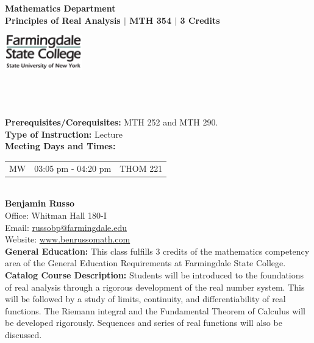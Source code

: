 \documentclass[11pt]{article}
\begin{document}
\begin{minipage}[]{.7\textwidth}
{\bf Mathematics Department}\\
{\bf  Principles of Real Analysis $\mid$  MTH 354 $\mid$ 3 Credits}
\end{minipage}\begin{minipage}[]{.3\textwidth}\begin{flushright}\includegraphics[height=1.5cm]{farmingdalelogo.jpg}\end{flushright}\end{minipage}\\
\ \\ 
\ \\
{\bf Prerequisites/Corequisites:} MTH 252 and MTH 290.\\

{\bf Type of Instruction: }Lecture\\

{\bf Meeting Days and Times: }\begin{tabular}[t]{rrr}
MW & 03:05 pm - 04:20 pm &THOM 221\\
\end{tabular}\\

{\bf Benjamin Russo}\\
Office: Whitman Hall 180-I\\
Email:  \href{mailto:russobp@farmingdale.edu}{russobp@farmingdale.edu}\\
Website: \href{http://www.benrussomath.com}{www.benrussomath.com}\\

{\bf General Education:}
This class fulfills 3 credits of the mathematics competency area of the General Education Requirements at Farmingdale State College.\\

{\bf Catalog Course Description:}
Students will be introduced to the foundations of real analysis through a rigorous development of the real number system. This will be followed by a study of limits, continuity, and differentiability of real functions. The Riemann integral and the Fundamental Theorem of Calculus will be developed rigorously. Sequences and series of real functions will also be discussed.\\
\end{document}
